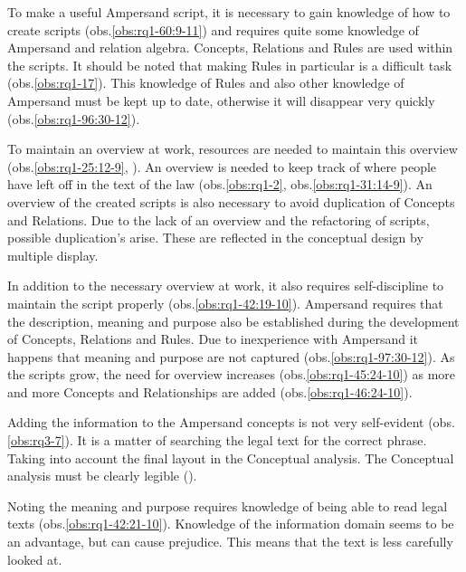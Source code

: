 To make a useful Ampersand script, it is necessary to gain knowledge of how to create scripts (obs.\ref{obs:rq1-60:9-11}) and 
requires quite some knowledge of Ampersand and relation algebra.
Concepts, Relations and Rules are used within the scripts.
It should be noted that making Rules in particular is a difficult task (obs.\ref{obs:rq1-17}).
This knowledge of Rules and also other knowledge of Ampersand must be kept up to date, otherwise it will disappear very quickly (obs.\ref{obs:rq1-96:30-12}).

To maintain an overview at work, resources are needed to maintain this overview (obs.\ref{obs:rq1-25:12-9}, ).
An overview is needed to keep track of where people have left off in the text of the law (obs.\ref{obs:rq1-2}, obs.\ref{obs:rq1-31:14-9}).
An overview of the created scripts is also necessary to avoid duplication of Concepts and Relations.
Due to the lack of an overview and the refactoring of scripts, possible duplication's arise.
These are reflected in the conceptual design by multiple display.

In addition to the necessary overview at work, it also requires self-discipline to maintain the script properly (obs.\ref{obs:rq1-42:19-10}).
Ampersand requires that the description, meaning and purpose also be established during the development of Concepts, Relations and Rules.
Due to inexperience with Ampersand it happens that meaning and purpose are not captured (obs.\ref{obs:rq1-97:30-12}).
As the scripts grow, the need for overview increases (obs.\ref{obs:rq1-45:24-10}) as more and more Concepts and Relationships are added (obs.\ref{obs:rq1-46:24-10}).

Adding the information to the Ampersand concepts is not very self-evident (obs.\ref{obs:rq3-7}).
It is a matter of searching the legal text for the correct phrase.
Taking into account the final layout in the Conceptual analysis.
The Conceptual analysis must be clearly legible ().

Noting the meaning and purpose requires knowledge of being able to read legal texts (obs.\ref{obs:rq1-42:21-10}).
Knowledge of the information domain seems to be an advantage, but can cause prejudice.
This means that the text is less carefully looked at.

